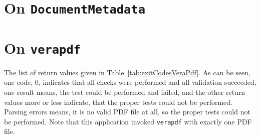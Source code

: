 \documentclass[10pt, a4paper]{article}
\makeatletter
\newcommand{\bs}{\symbol{'134}} %
\newcommand{\cmd}[2][]{\texttt{\bs{}#2#1}}
\newcommand{\cmd}[2][]{\texttt{\bs{}#2#1}\sindex[cmd]{#2@\texttt{\bs{}#2}}}
\makeatother
\begin{document}
%
%



\section{On \cmd{DocumentMetadata}}\label{sec:docMeta}


\section{On \texttt{verapdf}}\label{sec:veraPdf}%

The list of return values given in Table~\ref{tab:exitCodesVeraPdf}. 
As can be seen, one code, 0, indicates that all checks were performed 
and all validation succeeded, one result means, the test could be performed and failed, 
and the other return values more or less indicate, 
that the proper tests could not be performed. 
Parsing errors means, it is no valid PDF file at all, so the proper tests could not be performed. 
Note that this application invoked \texttt{verapdf} with exactly one PDF file. 
\end{document}

